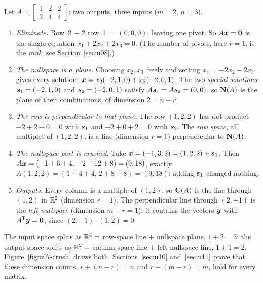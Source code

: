 \begin{example}\label{ex:u07-crush}
Let $A=\begin{bmatrix} 1&2&2\\ 2&4&4\end{bmatrix}$: two outputs, three inputs ($m=2$,
$n=3$).
\begin{enumerate}
  \item \emph{Eliminate.} Row~2 $-$ 2 row~1 $=(0,0,0)$, leaving one pivot. So $A\boldsymbol{x}=\boldsymbol{0}$ is
    the single equation $x_1+2x_2+2x_3=0$. (The number of pivots, here $r=1$, is the
    \emph{rank}; see Section~\ref{sec:u08}.)
  \item \emph{The nullspace is a plane.} Choosing $x_2,x_3$ freely and setting
    $x_1=-2x_2-2x_3$ gives every solution:
    $\boldsymbol{x}=x_2(-2,1,0)+x_3(-2,0,1)$. The two \emph{special solutions}
    $\boldsymbol{s}_1=(-2,1,0)$ and $\boldsymbol{s}_2=(-2,0,1)$ satisfy $A\boldsymbol{s}_1=A\boldsymbol{s}_2=(0,0)$, so $\mathbf{N}(A)$
    is the plane of their combinations, of dimension $2=n-r$.
  \item \emph{The row is perpendicular to that plane.} The row $(1,2,2)$ has dot product
    $-2+2+0=0$ with $\boldsymbol{s}_1$ and $-2+0+2=0$ with $\boldsymbol{s}_2$. The \emph{row space}, all
    multiples of $(1,2,2)$, is a line (dimension $r=1$) perpendicular to $\mathbf{N}(A)$.
  \item \emph{The nullspace part is crushed.} Take $\boldsymbol{x}=(-1,3,2)=(1,2,2)+\boldsymbol{s}_1$. Then
    $A\boldsymbol{x}=(-1+6+4,\,-2+12+8)=(9,18)$, exactly $A(1,2,2)=(1+4+4,\,2+8+8)=(9,18)$: adding
    $\boldsymbol{s}_1$ changed nothing.
  \item \emph{Outputs.} Every column is a multiple of $(1,2)$, so $\mathbf{C}(A)$ is the line through
    $(1,2)$ in $\mathbb{R}^2$ (dimension $r=1$). The perpendicular line through $(2,-1)$ is the
    \emph{left nullspace} (dimension $m-r=1$): it contains the vectors $\boldsymbol{y}$ with
    $A^{\mathsf{T}}\boldsymbol{y}=\boldsymbol{0}$, since $(2,-1)\cdot(1,2)=0$.
\end{enumerate}
The input space splits as $\mathbb{R}^3=$ row-space line $+$ nullspace plane, $1+2=3$; the output
space splits as $\mathbb{R}^2=$ column-space line $+$ left-nullspace line, $1+1=2$.
Figure~\ref{fig:u07-crush} draws both. Sections~\ref{sec:u10} and~\ref{sec:u11} prove that
these dimension counts, $r+(n-r)=n$ and $r+(m-r)=m$, hold for every matrix.
\end{example}

